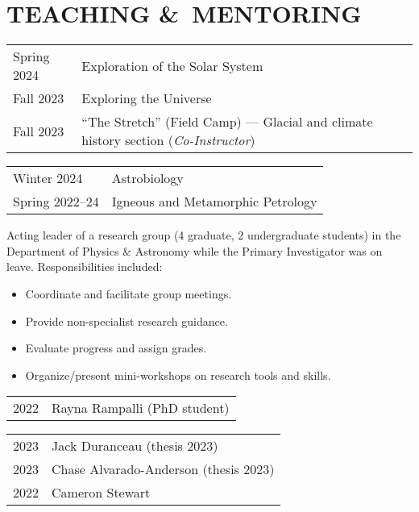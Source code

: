 \section*{TEACHING \&\ MENTORING}
\begin{tabular}{p{.15\linewidth} p{.85\linewidth}} %
	Spring 2024 & Exploration of the Solar System \\
	Fall 2023 & Exploring the Universe \\
	Fall 2023 & ``The Stretch'' (Field Camp) --- Glacial and climate history section (\emph{Co-Instructor})
	\end{tabular}

\begin{tabular}{p{.15\linewidth} p{.85\linewidth}} %
	Winter 2024 & Astrobiology\\
	Spring 2022--24 & Igneous and Metamorphic Petrology
\end{tabular}

Acting leader of a research group (4 graduate, 2 undergraduate students) in the Department of Physics \& Astronomy while the Primary Investigator was on leave. Responsibilities included:
\begin{itemize}
\item Coordinate and facilitate group meetings.
\item Provide non-specialist research guidance.
\item Evaluate progress and assign grades.
\item Organize/present mini-workshops on research tools and skills.
\end{itemize}

\begin{tabular}{ll}
	2022\ongoing & Rayna Rampalli (PhD student)\\
\end{tabular}
\begin{tabular}{ll}
	2023 & Jack Duranceau (thesis 2023)\\
	2023 & Chase Alvarado-Anderson (thesis 2023)\\
	2022 & Cameron Stewart \\
\end{tabular}

